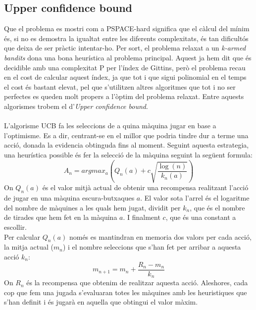 
	\subsection{Upper confidence bound}
	Que el problema es mostri com a PSPACE-hard significa que el càlcul del mínim és, si no es demostra la igualtat entre
	les diferents complexitats, és tan dificultós que deixa de ser pràctic intentar-ho. Per sort, el problema relaxat a un
	\textit{k-armed bandits} dona una bona heurística al problema principal. Aquest ja hem dit que és decidible amb una complexitat P
	 per l'índex de Gittins, però el problema recau en el cost de calcular aquest índex, ja que tot i que sigui polinomial en el temps
	el cost és bastant elevat, pel que s'utilitzen altres algoritmes que tot i no ser perfectes es queden molt propers a l'òptim del 
	problema relaxat. Entre aquests algorismes trobem el d'\textit{Upper confidence bound}. \\
	\\
	L'algorisme UCB fa les seleccions de a quina màquina jugar en base a l'optimisme. Es a dir, centrant-se en el millor que podria tindre dur a terme una acció, donada la evidencia obtinguda fins al moment.
	Seguint aquesta estrategia, una heurística possible és fer la selecció de la màquina seguint la següent formula:
	\[
	A_n = argmax_a(Q_n(a) + c\sqrt{\frac{\log (n)}{k_n(a)}})
	\]
	On $Q_n(a)$ és el valor mitjà actual de obtenir una recompensa realitzant l'acció de jugar en una màquina escura-butxaques $a$. 
	El valor sota l'arrel és el logaritme del nombre de màquines a les quals hem jugat, dividit per $k_n$, 
	que és el nombre de tirades que hem fet en la màquina $a$. I finalment $c$, que és una constant a escollir.\\
	 Per calcular $Q_n(a)$ només es mantindran en memoria dos valors per cada acció, la 
	mitja actual ($m_n$) i  el nombre seleccions que s'han fet per arribar a aquesta acció $k_n$: %
	\[
	m_{n+1} = m_n + \frac{R_n - m_n}{k_n}
	\]
	On $R_n$ és la recompensa que obtenim de realitzar aquesta acció.
	Aleshores, cada cop que fem una jugada s'evaluaran totes les màquines amb les heuristiques que s'han definit i és jugarà en aquella que obtingui el valor màxim. 
	
